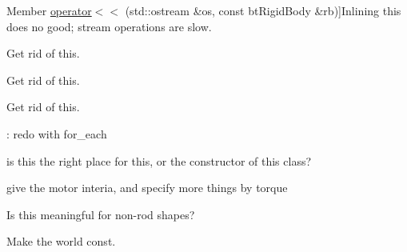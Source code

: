 \begin{DoxyRefList}
Member \hyperlink{tg_util_8h_ace7292f17ed230942b2acdc9fae321d6}{operator$<$$<$} (std\-::ostream \&os, const bt\-Rigid\-Body \&rb)]Inlining this does no good; stream operations are slow.  
\item[\label{todo__todo000055}%
\hypertarget{todo__todo000055}{}%
Member \hyperlink{class_spiral_spine_a375666b36e080f35dab35ebea12117a9}{Spiral\-Spine\-:\-:setup} (\hyperlink{classtg_world}{tg\-World} \&world)]Get rid of this.  
\item[\label{todo__todo000056}%
\hypertarget{todo__todo000056}{}%
Member \hyperlink{class_spiral_spine_a72bb17d2fabd672ae79dcd80c598303a}{Spiral\-Spine\-:\-:teardown} ()]Get rid of this.  
\item[\label{todo__todo000058}%
\hypertarget{todo__todo000058}{}%
Member \hyperlink{class_structure_test_model_a74f877900f9416a6182ce51f2783463e}{Structure\-Test\-Model\-:\-:setup} (\hyperlink{classtg_world}{tg\-World} \&world)]Get rid of this.  
\item[\label{todo__todo000039}%
\hypertarget{todo__todo000039}{}%
Member \hyperlink{class_tetra_spine_c_p_g_control_a1011f7ba6c6df843b8a7d3bd64f75ac5}{Tetra\-Spine\-C\-P\-G\-Control\-:\-:setup\-C\-P\-Gs} (\hyperlink{class_base_spine_model_learning}{Base\-Spine\-Model\-Learning} \&subject, array\-\_\-2\-D node\-Actions, array\-\_\-4\-D edge\-Actions)]\-: redo with for\-\_\-each  
\item[\label{todo__todo000007}%
\hypertarget{todo__todo000007}{}%
Member \hyperlink{structtg_base_string_1_1_config_ac40c60ffadf6ea368013580a4cc907bc}{tg\-Base\-String\-:\-:Config\-:\-:Config} (double s=1000.\-0, double d=10.\-0, bool h=false, double rot=0, double mf=1000.\-0, double t\-Vel=100.\-0, double mx\-Acc=10000.\-0, double mn\-A\-L=0.\-1, double mn\-R\-L=0.\-1)]is this the right place for this, or the constructor of this class?  
\item[\label{todo__todo000009}%
\hypertarget{todo__todo000009}{}%
Member \hyperlink{structtg_base_string_1_1_config_a0db6cb3d545d501cd40f2d24545e91e8}{tg\-Base\-String\-:\-:Config\-:\-:max\-Tens} ]give the motor interia, and specify more things by torque  
\item[\label{todo__todo000008}%
\hypertarget{todo__todo000008}{}%
Member \hyperlink{structtg_base_string_1_1_config_adcbba0b56f674d0c38b1fc98e99e3d64}{tg\-Base\-String\-:\-:Config\-:\-:rotation} ]Is this meaningful for non-\/rod shapes?  
\item[\label{todo__todo000010}%
\hypertarget{todo__todo000010}{}%
Member \hyperlink{classtg_bullet_renderer_a36638ecb277823712903573c06b77b4d}{tg\-Bullet\-Renderer\-:\-:tg\-Bullet\-Renderer} (\hyperlink{classtg_world}{tg\-World} \&world)]Make the world const.  

\end{DoxyRefList}
